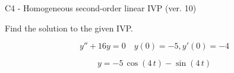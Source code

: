 \begin{exercise}
  \begin{exerciseTitle}C4 - Homogeneous second-order linear IVP (ver. 10)\end{exerciseTitle}
  \begin{exerciseStatement}
    
Find the solution to the given IVP.

    
\[y''+16y = 0 \hspace{1em} y(0) = -5 , y'(0) = -4\]

  \end{exerciseStatement}
  \begin{exerciseAnswer}
    
\[y= -5 \, \cos\left(4 \, t\right) - \sin\left(4 \, t\right)\]

  \end{exerciseAnswer}
\end{exercise}